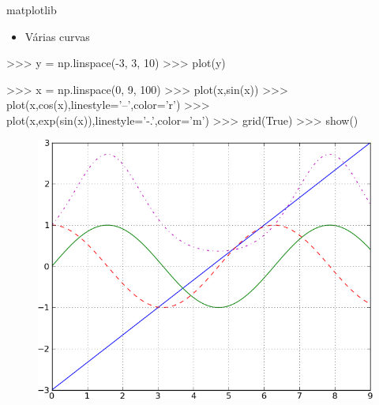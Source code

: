 \documentclass[12pt,t,graphics]{beamer}
\newcommand{\bi}{\begin{itemize}}
\newcommand{\ei}{\end{itemize}}
\begin{document}
\begin{frame}[t,fragile]{matplotlib}
	\vspace{-0.5cm}
	\bi
	\item Várias curvas
	\ei
	\begin{python}
>>> y = np.linspace(-3, 3, 10)
>>> plot(y)
		
>>> x = np.linspace(0, 9, 100)
>>> plot(x,sin(x))
>>> plot(x,cos(x),linestyle='--',color='r')
>>> plot(x,exp(sin(x)),linestyle='-.',color='m')
>>> grid(True)
>>> show()	
		\end{python}
		\begin{figure}
			\centering
			\includegraphics[scale=0.3]{img/plot3.png}
		\end{figure}
\end{frame}
\end{document}
